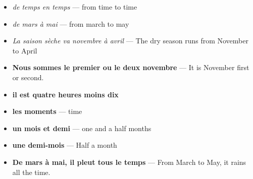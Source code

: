 \documentclass[a4paper,12pt]{article}
\begin{document}
\begin{itemize}
	\item \textit{de temps en temps} --- from time to time
	\item \textit{de mars \`a mai} --- from march to may
	\item \textit{La saison s\`eche va novembre \`a avril} --- The dry season runs from November to April
	\item \textbf{Nous sommes le premier ou le deux novembre} --- It is November first or second.
	\item \textbf{il est quatre heures moins dix}
	\item \textbf{les moments} --- time
	\item \textbf{un mois et demi} --- one and a half months
	\item \textbf{une demi-mois} --- Half a month
	\item \textbf{De mars \`a mai, il pleut tous le temps} --- From March to May, it rains all the time.
\end{itemize}
\end{document}
